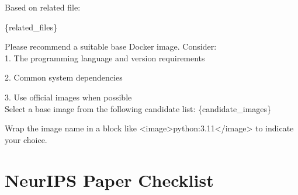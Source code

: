 \begin{tcolorbox}[colback=gray!5,colframe=black!50,fontupper=\ttfamily,title=Prompt for Base Image Selection]
Based on related file:

\{related\_files\}

Please recommend a suitable base Docker image. Consider:\\

1. The programming language and version requirements

2. Common system dependencies

3. Use official images when possible \\


Select a base image from the following candidate list:
\{candidate\_images\}

Wrap the image name in a block like <image>python:3.11</image> to indicate your choice.
\end{tcolorbox}



\section{NeurIPS Paper Checklist}


